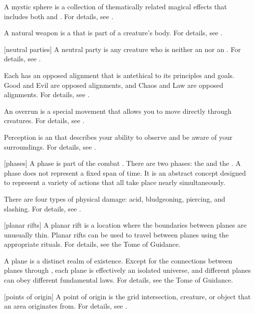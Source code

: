  A mystic sphere is a collection of thematically related magical effects that includes both  and .
For details, see .

 A natural weapon is a  that is part of a creature's body.
For details, see .

[neutral parties] A neutral party is any creature who is neither an  nor an .
For details, see .

 Each  has an opposed alignment that is antethical to its principles and goals.
Good and Evil are opposed alignments, and Chaos and Law are opposed alignments.
For details, see .

 An overrun is a special movement that allows you to move directly through creatures.
For details, see .

 Perception is an  that describes your ability to observe and be aware of your surroundings.
For details, see .

[phases] A phase is part of the combat .
There are two phases: the  and the .
A phase does not represent a fixed span of time.
It is an abstract concept designed to represent a variety of actions that all take place nearly simultaneously.

 There are four types of physical damage: acid, bludgeoning, piercing, and slashing.
For details, see .

[planar rifts] A planar rift is a location where the boundaries between planes are unusually thin.
Planar rifts can be used to travel between planes using the appropriate rituals.
For details, see the Tome of Guidance.

 A plane is a distinct realm of existence.
Except for the connections between planes through , each plane is effectively an isolated universe, and different planes can obey different fundamental laws.
For details, see the Tome of Guidance.

[points of origin] A point of origin is the grid intersection, creature, or object that an area originates from.
For details, see .

